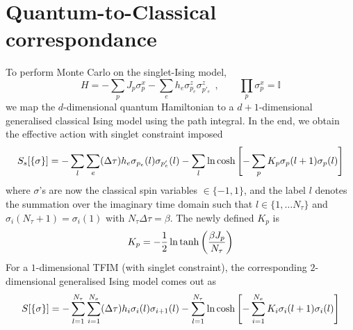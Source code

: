 \documentclass[../thesis_main.tex]{subfiles}
\begin{document}
\section{Quantum-to-Classical correspondance}
To perform Monte Carlo on the singlet-Ising model, 
\begin{equation}
    H = - \sum_p J_p \sigma^x_p - \sum_e h_e \sigma^z_{p_e} \sigma^z_{p'_e}\:\:, \qquad \prod_p \sigma^x_p = \mathbb{I}
    \label{Htfim}
\end{equation}  
we map the $d$-dimensional quantum Hamiltonian to a $d+1$-dimensional generalised classical Ising model using the path integral. In the end, we obtain the effective action with singlet constraint imposed
\begin{equation}
    S_s[\{\sigma\}] = -\sum_{l}\sum_{e} (\Delta \tau) h_e \sigma_{p_e}(l) \sigma_{p'_e}(l) - \sum_l \ln \cosh \qty[- \sum_p K_p \sigma_p(l+1) \sigma_p(l)] 
\end{equation}
where $\sigma$'s are now the classical spin variables $\in \{-1,1\}$, and the label $l$ denotes the summation over the imaginary time domain such that $l \in \{1, \ldots N_\tau\}$ and $\sigma_i(N_\tau +1) = \sigma_i(1)$ with $N_\tau \Delta \tau = \beta$. The newly defined $K_p$ is  
\[
    K_p = -\frac{1}{2} \ln \tanh\qty(\frac{\beta J_p}{N_\tau})  
\]
For a $1$-dimensional TFIM (with singlet constraint), the corresponding $2$-dimensional generalised Ising model comes out as
\begin{equation}
    S[\{\sigma\}] = -\sum_{l=1}^{N_\tau}\sum_{i=1}^{N_x} (\Delta \tau) h_i \sigma_{i}(l) \sigma_{i+1}(l) - \sum_{l=1}^{N_\tau} \ln \cosh \qty[- \sum_{i=1}^{N_x} K_i \sigma_i(l+1) \sigma_i(l)]
    \label{1Dtfimto2Dcim}
\end{equation}  
\end{document}
